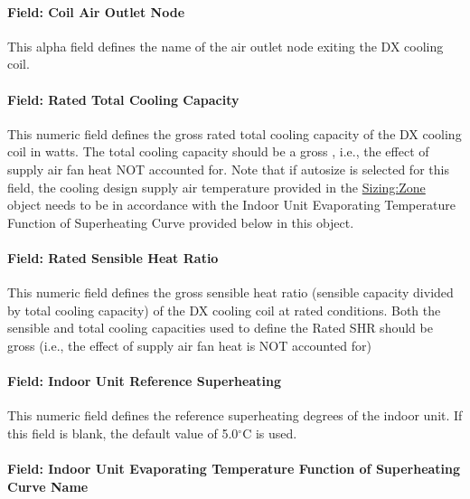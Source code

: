 \paragraph{Field: Coil Air Outlet Node}\label{field-coil-air-outlet-node-1}

This alpha field defines the name of the air outlet node exiting the DX cooling coil.

\paragraph{Field: Rated Total Cooling Capacity}\label{field-rated-total-cooling-capacity}

This numeric field defines the gross rated total cooling capacity of the DX cooling coil in watts. The total cooling capacity should be a gross , i.e., the effect of supply air fan heat NOT accounted for. Note that if autosize is selected for this field, the cooling design supply air temperature provided in the \hyperref[sizingzone]{Sizing:Zone} object needs to be in accordance with the Indoor Unit Evaporating Temperature Function of Superheating Curve provided below in this object.

\paragraph{Field: Rated Sensible Heat Ratio}\label{field-rated-sensible-heat-ratio}

This numeric field defines the gross sensible heat ratio (sensible capacity divided by total cooling capacity) of the DX cooling coil at rated conditions. Both the sensible and total cooling capacities used to define the Rated SHR should be gross (i.e., the effect of supply air fan heat is NOT accounted for)

\paragraph{Field: Indoor Unit Reference Superheating}\label{field-indoor-unit-reference-superheating}

This numeric field defines the reference superheating degrees of the indoor unit. If this field is blank, the default value of 5.0$^\circ$C is used.

\paragraph{Field: Indoor Unit Evaporating Temperature Function of Superheating Curve Name}\label{field-indoor-unit-evaporating-temperature-function-of-superheating-curve-name}

